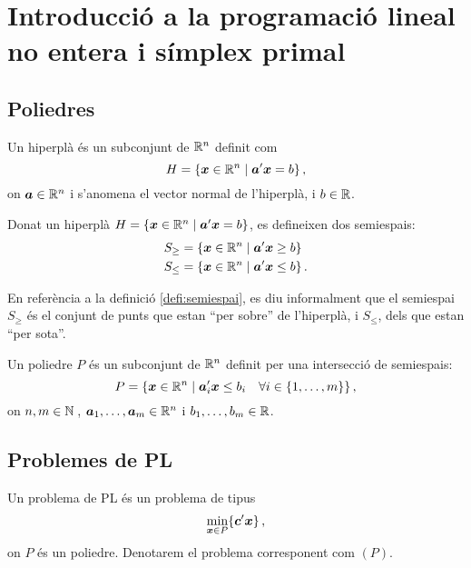 \chapter[Introducció a la prog. lineal \& símplex primal]%
{Introducció a la programació lineal no entera i símplex primal}

\section{Poliedres}
\begin{defi}[Hiperplà]\label{defi:hiperpla}
	Un hiperplà és un subconjunt de $\mathbb{R}^n$ definit com \[H = \{\boldsymbol{x}\in\mathbb{R}^n \mid \boldsymbol{a}'\boldsymbol{x}=b \}\,, \] on $\boldsymbol{a}\in\mathbb{R}^n$ i s'anomena el vector normal de l'hiperplà, i $b\in\mathbb{R}$.
\end{defi}

\begin{defi}[Semiespai]\label{defi:semiespai}
	Donat un hiperplà $H = \{\boldsymbol{x}\in\mathbb{R}^n \mid \boldsymbol{a}'\boldsymbol{x}=b \}$, es defineixen dos semiespais: 
	\begin{align*}
		S_{\ge} &= \{\boldsymbol{x}\in\mathbb{R}^n \mid \boldsymbol{a}'\boldsymbol{x} \ge b \}\\
		S_{\le} &= \{\boldsymbol{x}\in\mathbb{R}^n \mid \boldsymbol{a}'\boldsymbol{x} \le b \}\,.
	\end{align*}
\end{defi}

En referència a la definició \ref{defi:semiespai}, es diu informalment que el semiespai $S_\ge$ és el conjunt de punts que estan ``per sobre'' de l'hiperplà, i $S_\le$, dels que estan ``per sota''.

\begin{defi}[Poliedre]\label{defi:poliedre}
	Un poliedre $P$ és un subconjunt de $\mathbb{R}^n$ definit per una intersecció de semiespais: \[P = \{\boldsymbol{x}\in\mathbb{R}^n \mid \boldsymbol{a}_i'\boldsymbol{x} \le b_i \quad \forall i\in \{1,\ldots,m\} \}\,,\] on $n,m\in\mathbb{N}\,$, $\boldsymbol{a}_1,\ldots,\boldsymbol{a}_m \in \mathbb{R}^n$ i $b_1,\ldots,b_m\in\mathbb{R}$.
\end{defi}


\section{Problemes de PL}
\begin{prop}
	Un problema de PL és un problema de tipus
	\[
		\min\limits_{\boldsymbol{x}\in P} \{\boldsymbol{c}'\boldsymbol{x}\}\,,
	\]
	on $P$ és un poliedre. Denotarem el problema corresponent com $(P)$.
\end{prop}

